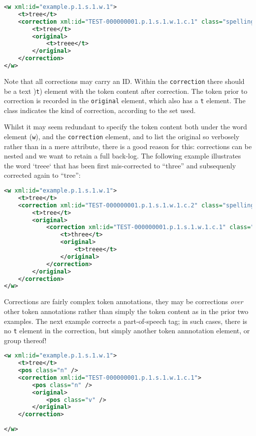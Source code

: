 \documentclass[a4paper,12pt]{report}
\begin{document}
\begin{lstlisting}[language=xml]
<w xml:id="example.p.1.s.1.w.1">
    <t>tree</t>
    <correction xml:id="TEST-000000001.p.1.s.1.w.1.c.1" class="spelling">
        <t>tree</t>
        <original>
            <t>treee</t>
        </original>
    </correction>
</w>
\end{lstlisting}

Note that all corrections may carry an ID. Within the \texttt{correction} there should be a text )\texttt{t}) element with the token content after correction. The token prior to correction is recorded in the \texttt{original} element, which also has a \texttt{t} element. The class indicates the kind of correction, according to the set used. 

Whilst it may seem redundant to specify the token content both under the word element (\texttt{w}), and the \texttt{correction} element, and to list the original so verbosely rather than in a mere attribute, there is a good reason for this: corrections can be nested and we want to retain a full back-log. The following example illustrates the word `treee` that has been first mis-corrected to ``three'' and subsequenly corrected again to ``tree'':

\begin{lstlisting}[language=xml]
<w xml:id="example.p.1.s.1.w.1">
    <t>tree</t>
    <correction xml:id="TEST-000000001.p.1.s.1.w.1.c.2" class="spelling" annotator="Jane Doe" annotatortype="manual" confidence="1.0">
        <t>tree</t>
        <original>
            <correction xml:id="TEST-000000001.p.1.s.1.w.1.c.1" class="spelling" annotator="John Doe" annotatortype="manual" confidence="0.6">
                <t>three</t>
                <original>
                    <t>treee</t>
                </original>
            </correction>
        </original>
    </correction>
</w>
\end{lstlisting}

Corrections are fairly complex token annotations, they may be corrections \emph{over} other token annotations rather than simply the token content as in the prior two examples. The next example corrects a part-of-speech tag; in such cases, there is no \texttt{t} element in the correction, but simply another token annnotation element, or group thereof!

\begin{lstlisting}[language=xml]
<w xml:id="example.p.1.s.1.w.1">
    <t>tree</t>
    <pos class="n" />
    <correction xml:id="TEST-000000001.p.1.s.1.w.1.c.1">
        <pos class="n" />
        <original>
            <pos class="v" />
        </original>
    </correction>
    
</w>    
\end{lstlisting}
\end{document}
